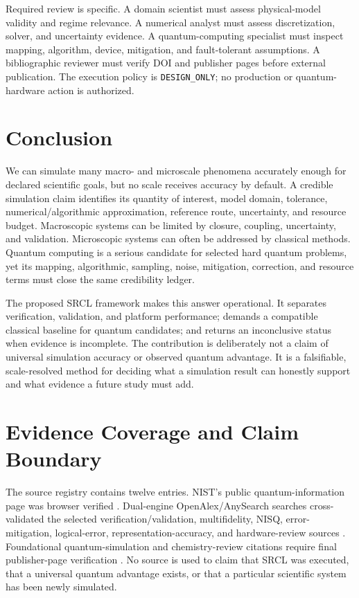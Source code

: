 \documentclass[conference]{../../../../Conference-LaTeX-template_10-17-19/IEEEtran}
\begin{document}
Required review is specific. A domain scientist must assess physical-model validity and regime relevance. A numerical analyst must assess discretization, solver, and uncertainty evidence. A quantum-computing specialist must inspect mapping, algorithm, device, mitigation, and fault-tolerant assumptions. A bibliographic reviewer must verify DOI and publisher pages before external publication. The execution policy is \texttt{DESIGN\_ONLY}; no production or quantum-hardware action is authorized.

\section{Conclusion}
We can simulate many macro- and microscale phenomena accurately enough for declared scientific goals, but no scale receives accuracy by default. A credible simulation claim identifies its quantity of interest, model domain, tolerance, numerical/algorithmic approximation, reference route, uncertainty, and resource budget. Macroscopic systems can be limited by closure, coupling, uncertainty, and validation. Microscopic systems can often be addressed by classical methods. Quantum computing is a serious candidate for selected hard quantum problems, yet its mapping, algorithmic, sampling, noise, mitigation, correction, and resource terms must close the same credibility ledger.

The proposed SRCL framework makes this answer operational. It separates verification, validation, and platform performance; demands a compatible classical baseline for quantum candidates; and returns an inconclusive status when evidence is incomplete. The contribution is deliberately not a claim of universal simulation accuracy or observed quantum advantage. It is a falsifiable, scale-resolved method for deciding what a simulation result can honestly support and what evidence a future study must add.

\appendices
\section{Evidence Coverage and Claim Boundary}
The source registry contains twelve entries. NIST’s public quantum-information page was browser verified \cite{nist_qis_page}. Dual-engine OpenAlex/AnySearch searches cross-validated the selected verification/validation, multifidelity, NISQ, error-mitigation, logical-error, representation-accuracy, and hardware-review sources \cite{oberkampf_trucano2002,oberkampf_trucano2007,peherstorfer2018,preskill2018,obrien2023,google2023,takeshita2020,wendin2017}. Foundational quantum-simulation and chemistry-review citations require final publisher-page verification \cite{feynman1982,lloyd1996,bauer2020}. No source is used to claim that SRCL was executed, that a universal quantum advantage exists, or that a particular scientific system has been newly simulated.
\end{document}
